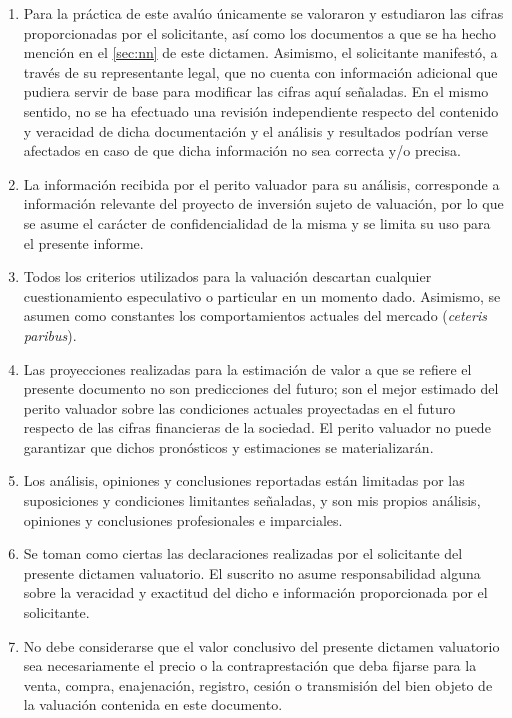 \begin{enumerate}[\indent a)]
\item Para la práctica de este avalúo únicamente se valoraron y estudiaron las cifras proporcionadas por el solicitante, así como los documentos a que se ha hecho mención en el \autoref{sec:nn} de este dictamen. Asimismo, el solicitante manifestó, a través de su representante legal, que no cuenta con información adicional que pudiera servir de base para modificar las cifras aquí señaladas. En el mismo sentido, no se ha efectuado una revisión independiente respecto del contenido y veracidad de dicha documentación y el análisis y resultados podrían verse afectados en caso de que dicha información no sea correcta y/o precisa.

\item La información recibida por el perito valuador para su análisis, corresponde a información relevante del proyecto de inversión sujeto de valuación, por lo que se asume el carácter de confidencialidad de la misma y se limita su uso para el presente informe.

\item Todos los criterios utilizados para la valuación descartan cualquier cuestionamiento especulativo o particular en un momento dado. Asimismo, se asumen como constantes los comportamientos actuales del mercado (\textit{ceteris paribus}).

\item Las proyecciones realizadas para la estimación de valor a que se refiere el presente documento no son predicciones del futuro; son el mejor estimado del perito valuador sobre las condiciones actuales proyectadas en el futuro respecto de las cifras financieras de la sociedad. El perito valuador no puede garantizar que dichos pronósticos y estimaciones se materializarán.

\item Los análisis, opiniones y conclusiones reportadas están limitadas por las suposiciones y condiciones limitantes señaladas, y son mis propios análisis, opiniones y conclusiones profesionales e imparciales.

\item Se toman como ciertas las declaraciones realizadas por el solicitante del presente dictamen valuatorio. El suscrito no asume responsabilidad alguna sobre la veracidad y exactitud del dicho e información proporcionada por el solicitante.

\item No debe considerarse que el valor conclusivo del presente dictamen valuatorio sea necesariamente el precio o la contraprestación que deba fijarse para la venta, compra, enajenación, registro, cesión o transmisión del bien objeto de la valuación   contenida en este documento.


\end{enumerate}
